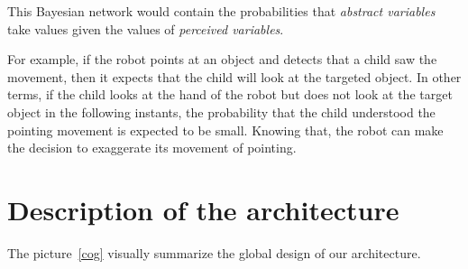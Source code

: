 \documentclass[conference]{IEEEtran}
\begin{document}
This Bayesian network would contain the probabilities that \emph{abstract variables} take values given the values of \emph{perceived variables}. 

For example, if the robot points at an object and detects that a child saw the movement,
then it expects that the child will look at the targeted object. 
In other terms, if the child looks at the hand of the robot but does not look at the target object in the following instants,  
the probability that the child understood the pointing movement is expected to be small.
Knowing that, the robot can make the decision to exaggerate its movement of pointing. 


\section{Description of the architecture}
The picture~\ref{cog} visually summarize the global design of our architecture. 
\end{document}
